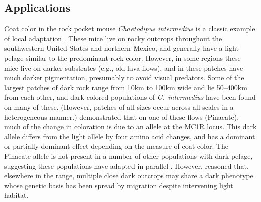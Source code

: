 \documentclass[10pt,letterpaper]{article}
\newcommand{\citep}[1]{\cite{#1}}
\newcommand{\citet}[1]{\cite{#1}}
\begin{document}
\subsection{Applications} 
\label{ss:applications}
%
% 

Coat color in the rock pocket mouse
\emph{Chaetodipus intermedius} is a classic example of local
adaptation 
\citep{benson1933concealing,DiceBlossom1937}.
These mice live on rocky outcrops throughout the southwestern United States and northern Mexico, 
and generally have a light pelage similar to the predominant rock color.
However, in some regions these mice live on darker substrates (e.g., old lava flows),
and in these patches have much darker pigmentation, 
presumably to avoid visual predators.
Some of the largest patches of dark rock range from 10km to 100km wide
and lie 50--400km from each other,
and dark-colored populations of \emph{C.\ intermedius} have been found on many of these.
(However, patches of all sizes occur across all scales in a heterogeneous manner.)
\citet{nachman2003genetic} demonstrated that on one of these flows (Pinacate), 
much of the change in coloration is due to an allele at the MC1R locus.
This dark allele differs from the light allele by four amino acid changes, 
and has a dominant or partially dominant effect depending on the measure of coat color.
The Pinacate allele is not present in a number of other populations with dark pelage,
suggesting these populations have adapted in parallel \citep{nachman2003genetic,hoekstra2003different}.
However, \citet{hoekstra2004local} reasoned that, elsewhere in the range, 
multiple close dark outcrops may share a dark phenotype whose genetic basis has been spread by migration
despite intervening light habitat. 
\end{document}
